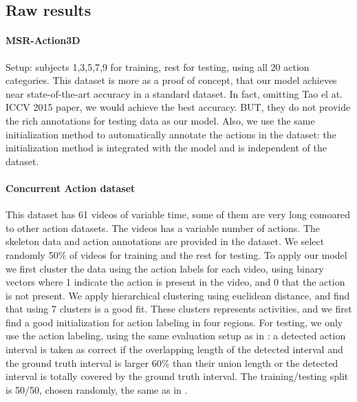 \subsection{Raw results}
\label{subsec:exp_setup}

\paragraph{MSR-Action3D} Setup: subjects 1,3,5,7,9 for training, rest for testing, using all 20 action categories. This dataset is more as a proof of concept, that our model achieves near state-of-the-art accuracy in a standard dataset. In fact, omitting Tao el at. ICCV 2015 paper, we would achieve the best accuracy. BUT, they do not provide the rich annotations for testing data as our model. Also, we use the same initialization method to automatically annotate the actions in the dataset: the initialization method is integrated with the model and is independent of the dataset.

\paragraph{Concurrent Action dataset} This dataset has 61 videos of variable time, some of them are very long comoared to other action datasets. The videos has a variable number of actions. The skeleton data and action annotations are provided in the dataset. We select randomly 50\% of videos for training and the rest for testing. To apply our model we first cluster the data using the action labels for each video, using binary vectors where 1 indicate the action is present in the video, and 0 that the action is not present. We apply hierarchical clustering using euclidean distance, and find that using 7 clusters is a good fit. These clusters represents activities, and we first find a good initialization for action labeling in four regions. For testing, we only use the action labeling, using the same evaluation setup as in \cite{Wei2013}: a detected action interval is taken as correct if the overlapping length of the detected interval and the ground truth interval is larger 60\% than their union length or the detected interval is totally covered by the ground truth interval. The training/testing split is 50/50, chosen randomly, the same as in \cite{Wei2013}.

